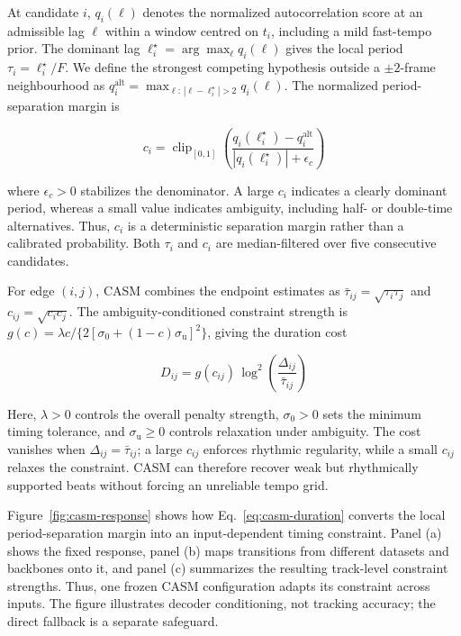 \documentclass{article}
\begin{document}
At candidate $i$, $q_i(\ell)$ denotes the normalized
autocorrelation score at an admissible lag $\ell$ within a window
centred on $t_i$, including a mild fast-tempo prior. The dominant lag
$\ell_i^\star=\arg\max_\ell q_i(\ell)$ gives the local period
$\tau_i=\ell_i^\star/F$. We define the strongest competing hypothesis
outside a $\pm2$-frame neighbourhood as
$q_i^{\mathrm{alt}}
=\max_{\ell:\,|\ell-\ell_i^\star|>2}q_i(\ell)$.
The normalized period-separation margin is

\begin{equation}
c_i =
\operatorname{clip}_{[0,1]}\!\left(
\frac{
q_i(\ell_i^\star)-q_i^{\mathrm{alt}}
}{
|q_i(\ell_i^\star)|+\epsilon_c
}
\right)
\label{eq:casm-reliability}
\end{equation}

where $\epsilon_c>0$ stabilizes the denominator. A large $c_i$
indicates a clearly dominant period, whereas a small value indicates
ambiguity, including half- or double-time alternatives. Thus, $c_i$ is a deterministic separation margin rather than a calibrated
probability. Both $\tau_i$ and $c_i$ are median-filtered over five
consecutive candidates.

For edge $(i,j)$, CASM combines the endpoint estimates as
$\bar{\tau}_{ij}=\sqrt{\tau_i\tau_j}$ and
$c_{ij}=\sqrt{c_i c_j}$. The ambiguity-conditioned constraint strength
is
$g(c)=\lambda c/\{2[\sigma_0+(1-c)\sigma_{\mathrm u}]^2\}$,
giving the duration cost

\begin{equation}
D_{ij}
=
g(c_{ij})\,
\log^2\!\left(
\frac{\Delta_{ij}}{\bar{\tau}_{ij}}
\right)
\label{eq:casm-duration}
\end{equation}

Here, $\lambda>0$ controls the overall penalty strength,
$\sigma_0>0$ sets the minimum timing tolerance, and
$\sigma_{\mathrm u}\geq0$ controls relaxation under ambiguity.
The cost vanishes when $\Delta_{ij}=\bar{\tau}_{ij}$; a large $c_{ij}$
enforces rhythmic regularity, while a small $c_{ij}$ relaxes the
constraint. CASM can therefore recover weak but rhythmically supported beats without forcing an unreliable tempo grid.

Figure~\ref{fig:casm-response} shows how Eq.~\eqref{eq:casm-duration} converts the local period-separation margin into an input-dependent timing constraint. Panel (a) shows the fixed response, panel (b) maps transitions from different datasets and backbones onto it, and panel (c) summarizes the resulting track-level
constraint strengths. Thus, one frozen CASM configuration adapts its
constraint across inputs. The figure illustrates decoder conditioning,
not tracking accuracy; the direct fallback is a separate safeguard.
\end{document}
